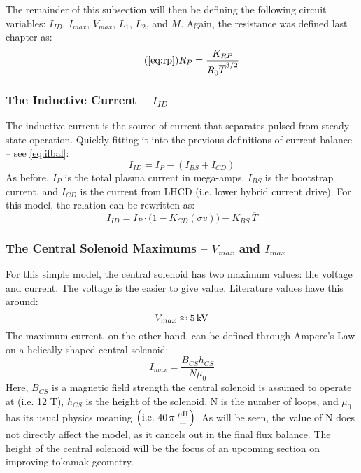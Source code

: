 The remainder of this subsection will then be defining the following circuit variables: $I_{ID}$, $I_{max}$, $V_{max}$, $L_1$, $L_2$, and $M$. Again, the resistance was defined last chapter as:
\begin{equation}
	\tag{\ref{eq:rp}}
	R_P = \frac{K_{RP}}{R_0 \overline T ^ {3/2}}
\end{equation}

\subsubsection{The Inductive Current -- $I_{ID}$}

The inductive current is the source of current that separates pulsed from steady-state operation. Quickly fitting it into the previous definitions of current balance -- see \cref{eq:ifbal}:
\begin{equation}
	I_{ID} = I_P - ( I_{BS} + I_{CD} )
\end{equation}
As before, $I_P$ is the total plasma current in mega-amps, $I_{BS}$ is the bootstrap current, and $I_{CD}$ is the current from LHCD (i.e. lower hybrid current drive). For this model, the relation can be rewritten as:
\begin{equation}
	I_{ID} = I_P \cdot \Big( 1 - K_{CD} ( \sigma v ) \Big) - K_{BS} \, \overline T
\end{equation}

\subsubsection{The Central Solenoid Maximums -- $V_{max}$ and $I_{max}$}

For this simple model, the central solenoid has two maximum values: the voltage and current. The voltage is the easier to give value. Literature values have this around: \cite{arc}
\begin{equation}
	V_{max} \approx 5 \, \textnormal{kV}
\end{equation}
The maximum current, on the other hand, can be defined through Ampere's Law on a helically-shaped central solenoid: \cite{griffiths}
\begin{equation}
	I_{max} = \frac{B_{CS} h_{CS}}{N \mu_0}
\end{equation}
Here, $B_{CS}$ is a magnetic field strength the central solenoid is assumed to operate at (i.e. 12 T), $h_{CS}$ is the height of the solenoid, N is the number of loops, and $\mu_0$ has its usual physics meaning $\left( \textnormal{i.e.} \ 40 \, \pi \, \frac{ \mu \textnormal{H}}{\textnormal{m}} \right)$. As will be seen, the value of N does not directly affect the model, as it cancels out in the final flux balance. The height of the central solenoid will be the focus of an upcoming section on improving tokamak geometry.

